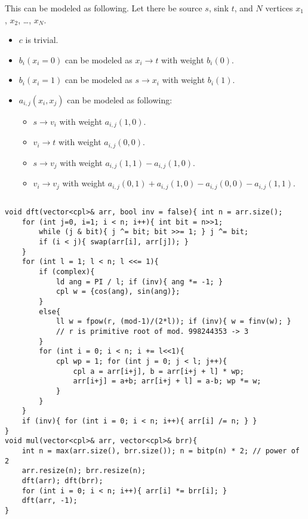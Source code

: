\documentclass[landscape, 8pt, a4paper, oneside, twocolumn]{extarticle}
\begin{document}
This can be modeled as following. Let there be source $s$, sink $t$, and $N$ vertices $x_1$, $x_2$, \ldots, $x_N$.
\begin{itemize}
	\item $c$ is trivial.
	\item $b_i(x_i = 0)$ can be modeled as $x_i \to t$ with weight $b_i(0)$.
	\item $b_i(x_i = 1)$ can be modeled as $s \to x_i$ with weight $b_i(1)$.
	\item $a_{i,j}(x_i, x_j)$ can be modeled as following:
	\begin{itemize}
		\item $s \to v_i$ with weight $a_{i,j}(1,0)$.
		\item $v_i \to t$ with weight $a_{i,j}(0,0)$.
		\item $s \to v_j$ with weight $a_{i,j}(1,1)-a_{i,j}(1,0)$.
		\item $v_i \to v_j$ with weight $a_{i,j}(0,1)+a_{i,j}(1,0)-a_{i,j}(0,0)-a_{i,j}(1,1)$.
	\end{itemize}
\end{itemize}
\subsection{}
\begin{verbatim}
void dft(vector<cpl>& arr, bool inv = false){ int n = arr.size();
    for (int j=0, i=1; i < n; i++){ int bit = n>>1;
        while (j & bit){ j ^= bit; bit >>= 1; } j ^= bit;
        if (i < j){ swap(arr[i], arr[j]); }
    }
    for (int l = 1; l < n; l <<= 1){
        if (complex){
            ld ang = PI / l; if (inv){ ang *= -1; }
            cpl w = {cos(ang), sin(ang)};
        }
        else{
            ll w = fpow(r, (mod-1)/(2*l)); if (inv){ w = finv(w); }
            // r is primitive root of mod. 998244353 -> 3
        }
        for (int i = 0; i < n; i += l<<1){
            cpl wp = 1; for (int j = 0; j < l; j++){
                cpl a = arr[i+j], b = arr[i+j + l] * wp;
                arr[i+j] = a+b; arr[i+j + l] = a-b; wp *= w;
            }
        }
    }
    if (inv){ for (int i = 0; i < n; i++){ arr[i] /= n; } }
}
void mul(vector<cpl>& arr, vector<cpl>& brr){
    int n = max(arr.size(), brr.size()); n = bitp(n) * 2; // power of 2
    arr.resize(n); brr.resize(n);
    dft(arr); dft(brr);
    for (int i = 0; i < n; i++){ arr[i] *= brr[i]; }
    dft(arr, -1);
}
\end{verbatim}
\end{document}

